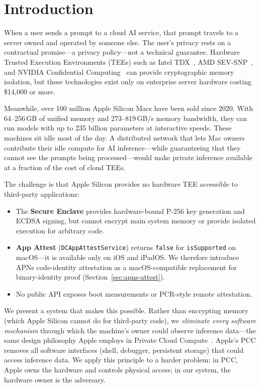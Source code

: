 \documentclass[10pt,twocolumn,letterpaper]{article}
\begin{document}
\section{Introduction}
\label{sec:intro}

When a user sends a prompt to a cloud AI service, that prompt travels to a server owned and operated by someone else. The user's privacy rests on a contractual promise---a privacy policy---not a technical guarantee. Hardware Trusted Execution Environments (TEEs) such as Intel TDX~\cite{intel-tdx}, AMD SEV-SNP~\cite{amd-sev}, and NVIDIA Confidential Computing~\cite{nvidia-cc} can provide cryptographic memory isolation, but these technologies exist only on enterprise server hardware costing \$14,000 or more.

Meanwhile, over 100 million Apple Silicon Macs have been sold since 2020. With 64--256\,GB of unified memory and 273--819\,GB/s memory bandwidth, they can run models with up to 235 billion parameters at interactive speeds. These machines sit idle most of the day. A distributed network that lets Mac owners contribute their idle compute for AI inference---while guaranteeing that they cannot see the prompts being processed---would make private inference available at a fraction of the cost of cloud TEEs.

The challenge is that Apple Silicon provides no hardware TEE accessible to third-party applications:

\begin{itemize}[leftmargin=*,itemsep=2pt,topsep=2pt]
    \item The \textbf{Secure Enclave} provides hardware-bound P-256 key generation and ECDSA signing, but cannot encrypt main system memory or provide isolated execution for arbitrary code.
    \item \textbf{App Attest} (\texttt{DCAppAttestService}) returns \texttt{false} for \texttt{isSupported} on macOS---it is available only on iOS and iPadOS. We therefore introduce APNs code-identity attestation as a macOS-compatible replacement for binary-identity proof (Section~\ref{sec:apns-attest}).
    \item No public API exposes boot measurements or PCR-style remote attestation.
\end{itemize}

We present a system that makes this possible. Rather than encrypting memory (which Apple Silicon cannot do for third-party code), we \emph{eliminate every software mechanism} through which the machine's owner could observe inference data---the same design philosophy Apple employs in Private Cloud Compute~\cite{apple-pcc}. Apple's PCC removes all software interfaces (shell, debugger, persistent storage) that could access inference data. We apply this principle to a harder problem: in PCC, Apple owns the hardware and controls physical access; in our system, the hardware owner is the adversary.
\end{document}
